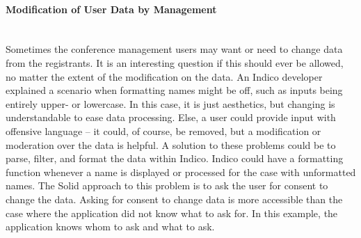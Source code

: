 \paragraph{Modification of User Data by Management}\mbox{}\\

Sometimes the conference management users may want or need to change data from the registrants. It is an interesting question if this should ever be allowed, no matter the extent of the modification on the data. An Indico developer explained a scenario when formatting names might be off, such as inputs being entirely upper- or lowercase. In this case, it is just aesthetics, but changing is understandable to ease data processing. Else, a user could provide input with offensive language -- it could, of course, be removed, but a modification or moderation over the data is helpful. A solution to these problems could be to parse, filter, and format the data within Indico. Indico could have a formatting function whenever a name is displayed or processed for the case with unformatted names. The Solid approach to this problem is to ask the user for consent to change the data. Asking for consent to change data is more accessible than the case where the application did not know what to ask for. In this example, the application knows whom to ask and what to ask.

